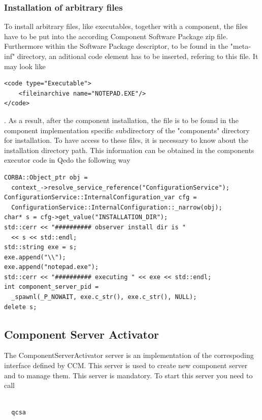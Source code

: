 \documentclass[12pt,a4paper]{report}
\begin{document}
\subsubsection{Installation of arbitrary files}
\label{sec:Installation of arbitrary code}

To install arbitrary files, like executables, together with a component, the files have to be put into the according Component Software Package zip file. Furthermore within the Software Package descriptor, to be found in the "meta-inf" directory, an aditional code element has to be inserted, refering to this file. It may look like
\begin{verbatim}
<code type="Executable">
    <fileinarchive name="NOTEPAD.EXE"/>
</code>
\end{verbatim}

. As a result, after the component installation, the file is to be found in the component implementation specific subdirectory of the "components" directory for installation. To have access to these files, it is necessary to know about the installation directory path. This information can be obtained in the components executor code in Qedo the following way

\small
\begin{verbatim}
CORBA::Object_ptr obj = 
  context_->resolve_service_reference("ConfigurationService");
ConfigurationService::InternalConfiguration_var cfg =
  ConfigurationService::InternalConfiguration::_narrow(obj);
char* s = cfg->get_value("INSTALLATION_DIR");
std::cerr << "########## observer install dir is "
  << s << std::endl;
std::string exe = s;
exe.append("\\");
exe.append("notepad.exe");
std::cerr << "########## executing " << exe << std::endl;
int component_server_pid = 
  _spawnl(_P_NOWAIT, exe.c_str(), exe.c_str(), NULL);
delete s;
\end{verbatim}
\normalsize

\subsection{Component Server Activator}
\label{sec:ComponentServerActivator}

The ComponentServerActivator server is an implementation of the correspoding interface defined by CCM. This server is used to create new component server and to manage them. This server is mandatory. To start this server you need to call 

\small
\begin{verbatim}

  qcsa

\end{verbatim}
\normalsize
\end{document}
